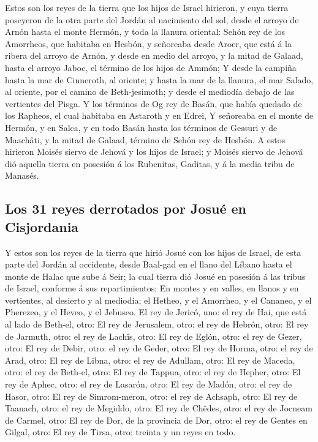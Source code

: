  Estos son los reyes de la tierra que los hijos de Israel
hirieron, y cuya tierra poseyeron de la otra parte del Jordán al
nacimiento del sol, desde el arroyo de Arnón hasta el monte Hermón, y
toda la llanura oriental:  Sehón rey de los Amorrheos, que
habitaba en Hesbón, y señoreaba desde Aroer, que está á la ribera del
arroyo de Arnón, y desde en medio del arroyo, y la mitad de Galaad,
hasta el arroyo Jaboc, el término de los hijos de Ammón;  Y
desde la campiña hasta la mar de Cinneroth, al oriente; y hasta la mar
de la llanura, el mar Salado, al oriente, por el camino de
Beth-jesimoth; y desde el mediodía debajo de las vertientes del Pisga.
 Y los términos de Og rey de Basán, que había quedado de los
Rapheos, el cual habitaba en Astaroth y en Edrei,  Y
señoreaba en el monte de Hermón, y en Salca, y en todo Basán hasta los
términos de Gessuri y de Maachâti, y la mitad de Galaad, término de
Sehón rey de Hesbón.  A estos hirieron Moisés siervo de
Jehová y los hijos de Israel; y Moisés siervo de Jehová dió aquella
tierra en posesión á los Rubenitas, Gaditas, y á la media tribu de
Manasés.

\hypertarget{los-31-reyes-derrotados-por-josuuxe9-en-cisjordania}{%
\subsection{Los 31 reyes derrotados por Josué en
Cisjordania}\label{los-31-reyes-derrotados-por-josuuxe9-en-cisjordania}}

 Y estos son los reyes de la tierra que hirió Josué con los
hijos de Israel, de esta parte del Jordán al occidente, desde Baal-gad
en el llano del Líbano hasta el monte de Halac que sube á Seir; la cual
tierra dió Josué en posesión á las tribus de Israel, conforme á sus
repartimientos;  En montes y en valles, en llanos y en
vertientes, al desierto y al mediodía; el Hetheo, y el Amorrheo, y el
Cananeo, y el Pherezeo, y el Heveo, y el Jebuseo.  El rey de
Jericó, uno: el rey de Hai, que está al lado de Beth-el, otro:
 El rey de Jerusalem, otro: el rey de Hebrón, otro:
 El rey de Jarmuth, otro: el rey de Lachîs, otro:
 El rey de Eglón, otro: el rey de Gezer, otro:
 El rey de Debir, otro: el rey de Geder, otro:
 El rey de Horma, otro: el rey de Arad, otro: 
El rey de Libna, otro: el rey de Adullam, otro:  El rey de
Maceda, otro: el rey de Beth-el, otro:  El rey de Tappua,
otro: el rey de Hepher, otro:  El rey de Aphec, otro: el
rey de Lasarón, otro:  El rey de Madón, otro: el rey de
Hasor, otro:  El rey de Simrom-meron, otro: el rey de
Achsaph, otro:  El rey de Taanach, otro: el rey de Megiddo,
otro:  El rey de Chêdes, otro: el rey de Jocneam de Carmel,
otro:  El rey de Dor, de la provincia de Dor, otro: el rey
de Gentes en Gilgal, otro:  El rey de Tirsa, otro: treinta
y un reyes en todo.

